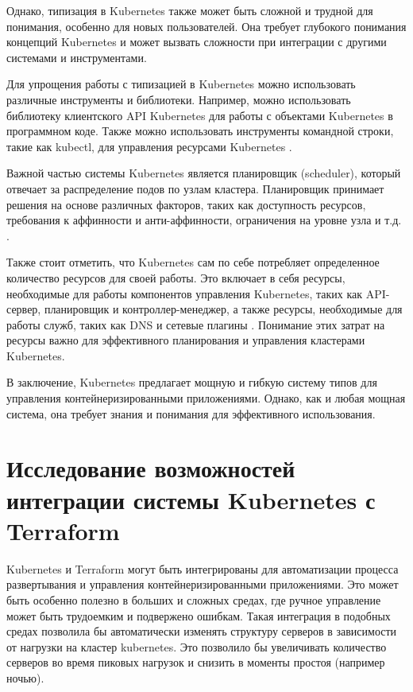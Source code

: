 Однако, типизация в Kubernetes также может быть сложной и трудной для
понимания, особенно для новых пользователей. Она требует глубокого
понимания концепций Kubernetes и может вызвать сложности при интеграции
с другими системами и инструментами.

Для упрощения работы с типизацией в Kubernetes можно использовать
различные инструменты и библиотеки. Например, можно использовать
библиотеку клиентского API \newline Kubernetes для работы с объектами Kubernetes
в программном коде. Также можно использовать инструменты командной строки,
такие как kubectl, для управления ресурсами Kubernetes \cite{kubectl}.

Важной частью системы Kubernetes является планировщик (scheduler),
который отвечает за распределение подов по узлам кластера. Планировщик
принимает решения на основе различных факторов, таких как доступность
ресурсов, требования к аффинности и анти-аффинности, ограничения на уровне
узла и т.д. \cite{carrion2022kubernetes}.

Также стоит отметить, что Kubernetes сам по себе потребляет определенное
количество ресурсов для своей работы. Это включает в себя ресурсы,
необходимые для работы компонентов управления Kubernetes, таких как
API-сервер, планировщик и контроллер-менеджер, а также ресурсы, необходимые
для работы служб, таких как DNS и сетевые плагины \cite{turin2023predicting}.
Понимание этих затрат на ресурсы важно для эффективного планирования и
управления кластерами Kubernetes.

В заключение, Kubernetes предлагает мощную и гибкую систему типов для
управления контейнеризированными приложениями. Однако, как и любая мощная
система, она требует знания и понимания для эффективного использования.

\section{Исследование возможностей интеграции системы Kubernetes с \newline
Terraform}
Kubernetes и Terraform могут быть интегрированы для автоматизации процесса
развертывания и управления контейнеризированными приложениями.
Это может быть особенно полезно в больших и сложных средах, где ручное
управление может быть трудоемким и подвержено ошибкам.
Такая интеграция в подобных средах позволила бы автоматически изменять
структуру серверов в зависимости от нагрузки на кластер kubernetes. 
Это позволило бы увеличивать количество серверов во время пиковых нагрузок
и снизить в моменты простоя (например ночью).

